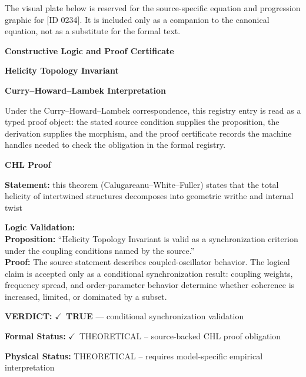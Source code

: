 \begingroup\footnotesize\sloppy
The visual plate below is reserved for the source-specific equation and progression graphic for [ID 0234]. It is included only as a companion to the canonical equation, not as a substitute for the formal text.
\par\endgroup
\ifTZPDarkEdition
{}
\fi

\clearpage
\begingroup\tzpsupportsetup
\noindent\textbf{\fontsize{10.8pt}{12.8pt}\selectfont [ID 0234] Constructive Logic and Proof Certificate}\par
\noindent\textbf{\fontsize{10pt}{12pt}\selectfont Helicity Topology Invariant}\par
\vspace{0.45em}
\begingroup
\footnotesize
\setlength{\parskip}{0.22em}
\setlength{\parindent}{0pt}
\noindent\textbf{Curry--Howard--Lambek Interpretation}\par
Under the Curry--Howard--Lambek correspondence, this registry entry is read as a typed proof
object: the stated source condition supplies the proposition, the derivation supplies the
morphism, and the proof certificate records the machine handles needed to check the obligation
in the formal registry.

\vspace{0.45em}
\noindent\textbf{CHL Proof}\par
\textbf{Statement:} this theorem (Calugareanu--White--Fuller) states that the total helicity of intertwined
structures decomposes into geometric writhe and internal twist

\textbf{Logic Validation:}\\
\textbf{Proposition:} ``Helicity Topology Invariant is valid as a synchronization criterion under the coupling
conditions named by the source.''\\
\textbf{Proof:} The source statement describes coupled-oscillator behavior. The logical claim is
accepted only as a conditional synchronization result: coupling weights, frequency
spread, and order-parameter behavior determine whether coherence is increased, limited,
or dominated by a subset.

\textbf{VERDICT:} \ensuremath{\checkmark}\ \textbf{TRUE} --- conditional synchronization validation

\textbf{Formal Status:} \ensuremath{\checkmark}\ THEORETICAL -- source-backed CHL proof obligation

\textbf{Physical Status:} THEORETICAL -- requires model-specific empirical interpretation
\par\vspace{0.45em}
\par
\ifTZPDarkEdition
{}
\fi
\endgroup
\endgroup

